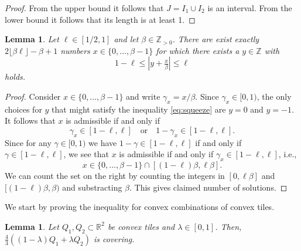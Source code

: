 \documentclass[11pt, a4paper]{amsart}
\newcommand{\RR}{\mathbb{R}}
\newcommand{\ZZ}{\mathbb{Z}}
\numberwithin{equation}{section}
\theoremstyle{plain}
\newtheorem{lemma}[theorem]{Lemma}
\begin{document}
\begin{proof}
From the upper bound it follows that $J = I_1\cup I_2$ is an interval. From the lower bound it follows that its length is at least 1. 
\end{proof}

\begin{lemma}
\label{lem:squeeze}
Let $\ell\in[1/2,1]$ and let $\beta \in \ZZ_{>0}$. There are exist exactly $2\lfloor \beta \ell\rfloor -\beta + 1$ numbers $x\in\{0,\dots,\beta-1\}$ for which there exists a $y\in\ZZ$ with 
\begin{equation}
\label{eq:squeeze}
1-\ell \leq \left|y+\tfrac x\beta\right| \leq \ell
\end{equation}
holds.
\end{lemma}

\begin{proof}
Consider $x\in\{0,\dots,\beta-1\}$ and write $\gamma_x = x/\beta$. Since $\gamma_x\in [0,1)$, the only choices for $y$ that might satisfy the inequality \eqref{eq:squeeze} are $y=0$ and $y=-1$. It follows that $x$ is admissible if and only if
\[
\gamma_x\in[1-\ell,\ell]\quad\text{or}\quad 1-\gamma_x\in [1-\ell,\ell].
\]
Since for any $\gamma\in [0,1)$ we have $1-\gamma\in [1-\ell,\ell]$ if and only if $\gamma\in [1-\ell,\ell]$, we see that $x$ is admissible if and only if $\gamma_x\in[1-\ell,\ell]$, i.e.,
\[
x\in \{0,\dots,\beta-1\} \cap [(1-\ell)\beta, \ell\beta].
\]
We can count the set on the right by counting the integers in $[0,\ell\beta]$ and $[(1-\ell)\beta,\beta)$ and substracting $\beta$. This gives claimed number of solutions.
\end{proof}

We start by proving the inequality for convex combinations of convex tiles.

\begin{lemma}\label{lem:1.5}
Let $Q_1,Q_2\subset \RR^2$ be convex tiles and $\lambda \in [0,1]$. Then, $\frac{4}{3}((1-\lambda)Q_1+\lambda Q_2)$ is covering.
\end{lemma}
\end{document}

